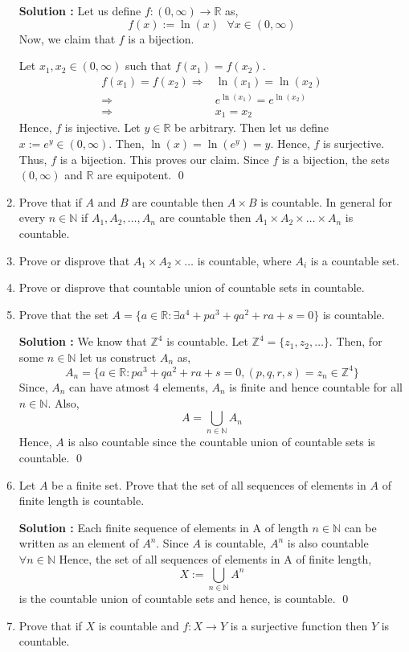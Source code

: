 \documentclass[10pt]{article}
\newcommand{\nn}{\mathbb{N}}
\newcommand{\rn}{\mathbb{R}}
\newcommand{\z}{\mathbb{Z}}
\begin{document}
\begin{enumerate}
    \textbf{Solution : }Let us define $f : (0, \infty) \to \rn$ as, $$f(x) := \ln(x) \,\,\,\, \forall x \in (0, \infty)$$ Now, we claim that $f$ is a bijection. 

    Let $x_1, x_2 \in (0, \infty)$ such that $f(x_1) = f(x_2)$. 
    \begin{align*}
        f(x_1) = f(x_2)
        \Rightarrow &\ln(x_1) = \ln(x_2) \\
        \Rightarrow &e^{\ln(x_1)} = e^{\ln(x_2)} \\
        \Rightarrow &x_1 = x_2
    \end{align*}
    Hence, $f$ is injective. Let $y \in \rn$ be arbitrary. Then let us define $x := e^y \in (0, \infty)$. Then, $\ln(x) = \ln(e^y) = y$. Hence, $f$ is surjective. Thus, $f$ is a bijection. This proves our claim. Since $f$ is a bijection, the sets $(0, \infty)$ and $\rn$ are equipotent. \qed
    \item Prove that if $A$ and $B$ are countable then $A \times B$ is countable. In general for every $n \in \nn$ if $A_1, A_2, \dots , A_n$ are countable then $A_1 \times A_2 \times \dots \times A_n$ is countable.
    \item Prove or disprove that $A_1 \times A_2 \times \dots$ is countable, where $A_i$ is a countable set.
    \item Prove or disprove that countable union of countable sets in countable.
    \item Prove that the set $A = \{ a \in \rn : \exists a^4 + pa^3 + qa^2 + ra + s = 0 \}$ is countable.
    
    \textbf{Solution : }We know that $\z^4$ is countable. Let $\z^4 = \{z_1, z_2, \dots \}$. Then, for some $n \in \nn$ let us construct $A_n$ as, $$A_n = \{a \in \rn : pa^3 + qa^2 + ra + s = 0, (p,q,r,s) = z_n \in \z^4 \}$$ Since, $A_n$ can have atmost 4 elements, $A_n$ is finite and hence countable for all $n \in \nn$. Also, $$A = \bigcup_{n\in\nn} A_n$$ Hence, $A$ is also countable since the countable union of countable sets is countable. \qed
    \item Let $A$ be a finite set. Prove that the set of all sequences of elements in $A$ of finite length is countable.

	    \textbf{Solution : }Each finite sequence of elements in A of length $n \in \nn$ can be written as 
	    an element of $A^n$. Since $A$ is countable, $A^n$ is also countable $\forall n\in \nn$
	    Hence, the set of all sequences of elements in A of finite length, 
	    $$ X:=\bigcup_{n \in \nn} A^n$$ is the countable union of countable sets and hence, is countable. \qed
    \item Prove that if $X$ is countable and $f : X \to Y$ is a surjective function then $Y$ is countable.


\end{enumerate}
\end{document}
